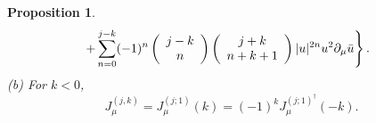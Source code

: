 \documentclass[makeidx,12pt,openany]{report}
\newtheorem{prop}[df]{Proposition}
\begin{document}
\begin{prop}
\begin{eqnarray}
  && \hspace{-6mm}
   \left.
    +\sum_{n=0}^{j-k} 
    (-1)^n
    \left(
     \begin{array}{c}
      j-k \\
       n  
     \end{array}
    \right)
    \left(
     \begin{array}{c}
       j+k \\
       n+k+1  
     \end{array}
    \right)
    |u|^{2n} u^2 \partial_{\mu}\bar{u}
   \right\} .
  \label{eqn:j19} 
 \end{eqnarray}
(b) For $k < 0$,
\begin{equation}
  J_{\mu}^{(j,k)}=
  J_{\mu}^{(j;1)}(k)=(-1)^k J_{\mu}^{(j;1)^{\dag}}(-k). 
 \label{eqn:j20}
\end{equation}
\end{prop}
\end{document}

